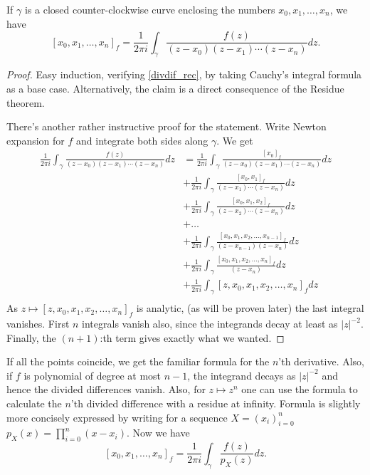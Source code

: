 \begin{lem}\label{div_cauchy}
If $\gamma$ is a closed counter-clockwise curve enclosing the numbers $x_{0}, x_{1}, \ldots, x_{n}$, we have
\[
	[x_{0}, x_{1}, \ldots, x_{n}]_{f} = \frac{1}{2 \pi i} \int_{\gamma} \frac{f(z)}{(z - x_{0})(z - x_{1}) \cdots (z - x_{n})} dz.
\]
\end{lem}
\begin{proof}
Easy induction, verifying \ref{divdif_rec}, by taking Cauchy's integral formula as a base case. Alternatively, the claim is a direct consequence of the Residue theorem.

There's another rather instructive proof for the statement. Write Newton expansion for $f$ and integrate both sides along $\gamma$. We get
\begin{align*}
	\frac{1}{2 \pi i} \int_{\gamma} \frac{f(z)}{(z - x_{0})(z - x_{1}) \cdots (z - x_{n})} dz &= \frac{1}{2 \pi i} \int_{\gamma} \frac{[x_{0}]_{f}}{(z - x_{0})(z - x_{1}) \cdots (z - x_{n})} dz \\
	&+ \frac{1}{2 \pi i} \int_{\gamma} \frac{[x_{0}, x_{1}]_{f}}{(z - x_{1}) \cdots (z - x_{n})} dz \\
	&+ \frac{1}{2 \pi i} \int_{\gamma} \frac{[x_{0}, x_{1}, x_{2}]_{f}}{(z - x_{2}) \cdots (z - x_{n})} dz \\
	&+ \ldots \\
	&+ \frac{1}{2 \pi i} \int_{\gamma} \frac{[x_{0}, x_{1}, x_{2}, \ldots, x_{n - 1}]_{f}}{(z - x_{n - 1})(z - x_{n})} dz \\
	&+ \frac{1}{2 \pi i} \int_{\gamma} \frac{[x_{0}, x_{1}, x_{2}, \ldots, x_{n}]_{f}}{(z - x_{n})} dz \\
	&+ \frac{1}{2 \pi i} \int_{\gamma} [z, x_{0}, x_{1}, x_{2}, \ldots, x_{n}]_{f} dz \\
\end{align*}
As $z \mapsto [z, x_{0}, x_{1}, x_{2}, \ldots, x_{n}]_{f}$ is analytic, (as will be proven later) the last integral vanishes. First $n$ integrals vanish also, since the integrands decay at least as $|z|^{-2}$. Finally, the $(n + 1)$:th term gives exactly what we wanted.
\end{proof}

If all the points coincide, we get the familiar formula for the $n$'th derivative. Also, if $f$ is polynomial of degree at most $n - 1$, the integrand decays as $|z|^{-2}$ and hence the divided differences vanish. Also, for $z \mapsto z^{n}$ one can use the formula to calculate the $n$'th divided difference with a residue at infinity. Formula is slightly more concisely expressed by writing for a sequence $X = (x_{i})_{i = 0}^{n}$ $p_{X}(x) = \prod_{i = 0}^{n} (x - x_{i})$. Now we have
\[
	[x_{0}, x_{1}, \ldots, x_{n}]_{f} = \frac{1}{2 \pi i} \int_{\gamma} \frac{f(z)}{p_{X}(z)} dz.
\]

